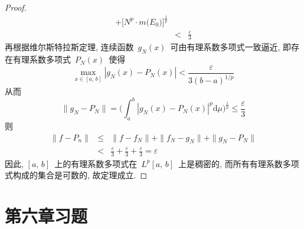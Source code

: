 \begin{proof}
\begin{eqnarray*}
+\big[N^{p}\cdot m\big(E_0\big)\big]^{\frac{1}{p}} \\
&<&\frac{\varepsilon}{3}
\end{eqnarray*}
再根据维尔斯特拉斯定理, 连续函数~$g_{N}(x)$~可由有理系数多项式一致逼近, 即存在有理系数多项式~$P_{N}(x)$~使得
\[
\max_{x\in [a,\,b]}|g_{N}(x)-P_{N}(x)|<\frac{\varepsilon}{3(b-a)^{1/p}}
\]
从而
\[
\|g_{N}-P_{N}\|=\Big(\int_{a}^{b}|g_{N}(x)-P_{N}(x)|^{p}\mathrm{d}\mu\Big)^{\frac{1}{p}}\leqslant \frac{\varepsilon}{3}
\]
则
\begin{eqnarray*}
\|f-P_{n}\|&\leqslant& \|f-f_{N}\|+\|f_{N}-g_{N}\|+\|g_{N}-P_{N}\|\\
&<&\frac{\varepsilon}{3}+\frac{\varepsilon}{3}+\frac{\varepsilon}{3}=\varepsilon
\end{eqnarray*}
因此, $[a,\,b]$~上的有理系数多项式在~$L^p[a,\,b]$~上是稠密的, 而所有有理系数多项式构成的集合是可数的, 故定理成立.
\end{proof}

\newpage

\vspace*{-0.6cm}

\section*{第六章习题}



